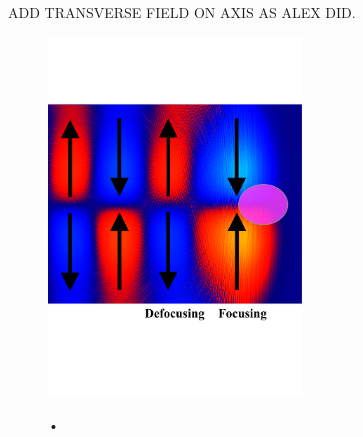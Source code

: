 ADD TRANSVERSE FIELD ON AXIS AS ALEX DID. 
\begin{figure}
\centering
\includegraphics[width=0.6\textwidth]{transverseforce3}
\label{transverse_plot}
\caption{•}
\end{figure}
